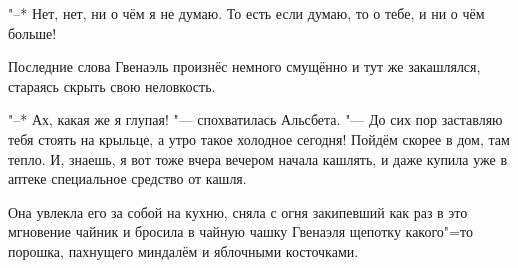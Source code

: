 "--* Нет, нет, ни о чём я не думаю.
То есть если думаю, то о тебе, и ни о чём больше!

Последние слова Гвенаэль произнёс немного смущённо и тут же закашлялся, стараясь
скрыть свою неловкость.

"--* Ах, какая же я глупая! "--- спохватилась Альсбета.
"--- До сих пор заставляю тебя стоять на крыльце, а утро такое холодное сегодня!
Пойдём скорее в дом, там тепло.
И, знаешь, я вот тоже вчера вечером начала кашлять, и даже купила уже в аптеке
специальное средство от кашля.

Она увлекла его за собой на кухню, сняла с огня закипевший как раз в это
мгновение чайник и бросила в чайную чашку Гвенаэля щепотку какого"=то порошка,
пахнущего миндалём и яблочными косточками.
